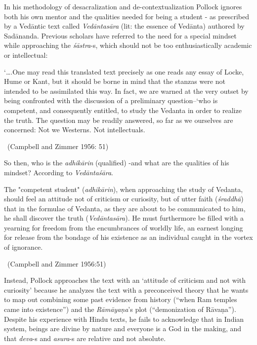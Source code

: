 In his methodology of desacralization and de-contextualization Pollock ignores both his own mentor and the qualities needed for being a student - as prescribed by a Vedāntic text called \textit{Vedāntasāra} (lit: the essence of Vedānta) authored by Sadānanda. Previous scholars have referred to the need for a special mindset while approaching the \textit{śāstra}-s, which should not be too enthusiastically academic or intellectual:

\begin{myquote}
‘….One may read this translated text precisely as one reads any essay of Locke, Hume or Kant, but it should be borne in mind that the stanzas were not intended to be assimilated this way. In fact, we are warned at the very outset by being confronted with the discussion of a preliminary question--‘who is competent, and consequently entitled, to study the Vedanta in order to realize the truth. The question may be readily answered, so far as we ourselves are concerned: Not we Westerns. Not intellectuals. 

~\hfill (Campbell and Zimmer 1956: 51)
\end{myquote}

So then, who is the \textit{adhikārin} (qualified) -and what are the qualities of his mindset? According to \textit{Vedāntaśāra}.

\begin{myquote}
The "competent student" (\textit{adhikārin}), when approaching the study of Vedanta, should feel an attitude not of criticism or curiosity, but of utter faith (\textit{śraddhā}) that in the formulae of Vedanta, as they are about to be communicated to him, he shall discover the truth (\textit{Vedāntasāra}). He must furthermore be filled with a yearning for freedom from the encumbrances of worldly life, an earnest longing for release from the bondage of his existence as an individual caught in the vortex of ignorance. 

~\hfill (Campbell and Zimmer 1956:51)
\end{myquote}

Instead, Pollock approaches the text with an ‘attitude of criticism and not with curiosity’ because he analyzes the text with a preconceived theory that he wants to map out combining some past evidence from history (“when Ram temples came into existence”) and the \textit{Rāmāyaṇa}’s plot (“demonization of Rāvaṇa”). Despite his experience with Hindu texts, he fails to acknowledge that in Indian system, beings are divine by nature and everyone is a God in the making, and that \textit{deva}-s and \textit{asura}-s are relative and not absolute.

